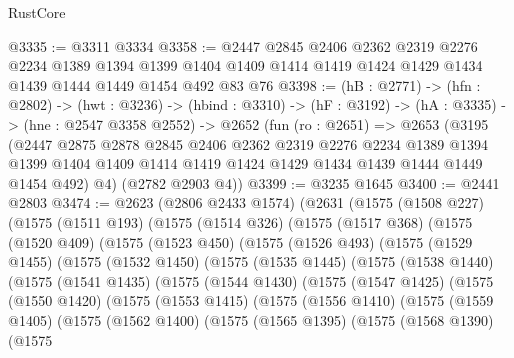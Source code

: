 \begin{lexlean}{RustCore}
\begin{coremodule}
@3335 := @3311 @3334
@3358 := @2447
    @2845
    @2406
    @2362
    @2319
    @2276
    @2234
    @1389
    @1394
    @1399
    @1404
    @1409
    @1414
    @1419
    @1424
    @1429
    @1434
    @1439
    @1444
    @1449
    @1454
    @492
    @83
    @76
@3398 := (hB : @2771) ->
  (hfn : @2802) ->
  (hwt : @3236) ->
  (hbind : @3310) ->
  (hF : @3192) ->
  (hA : @3335) ->
  (hne : @2547 @3358 @2552) ->
  @2652
    (fun (ro : @2651) =>
    @2653
      (@3195
        (@2447
          @2875
          @2878
          @2845
          @2406
          @2362
          @2319
          @2276
          @2234
          @1389
          @1394
          @1399
          @1404
          @1409
          @1414
          @1419
          @1424
          @1429
          @1434
          @1439
          @1444
          @1449
          @1454
          @492)
        @4)
      (@2782 @2903 @4))
@3399 := @3235 @1645
@3400 := @2441 @2803
@3474 := @2623
    (@2806 @2433 @1574)
    (@2631
      (@1575
        (@1508 @227)
        (@1575
          (@1511 @193)
          (@1575
            (@1514 @326)
            (@1575
              (@1517 @368)
              (@1575
                (@1520 @409)
                (@1575
                  (@1523 @450)
                  (@1575
                    (@1526 @493)
                    (@1575
                      (@1529 @1455)
                      (@1575
                        (@1532 @1450)
                        (@1575
                          (@1535 @1445)
                          (@1575
                            (@1538 @1440)
                            (@1575
                              (@1541 @1435)
                              (@1575
                                (@1544 @1430)
                                (@1575
                                  (@1547 @1425)
                                  (@1575
                                    (@1550 @1420)
                                    (@1575
                                      (@1553 @1415)
                                      (@1575
                                        (@1556 @1410)
                                        (@1575
                                          (@1559 @1405)
                                          (@1575
                                            (@1562 @1400)
                                            (@1575
                                              (@1565 @1395)
                                              (@1575
                                                (@1568 @1390)
                                                (@1575

\end{coremodule}
\end{lexlean}
